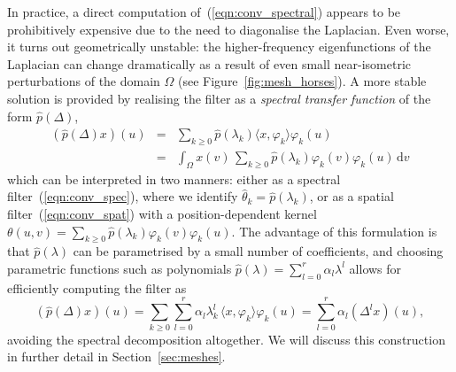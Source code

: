 %
In practice, a direct computation of~(\ref{eqn:conv_spectral}) appears to be prohibitively expensive due to the need to diagonalise the Laplacian. Even worse, 
it turns out geometrically unstable: the higher-frequency eigenfunctions of the Laplacian can change dramatically as a result of even small near-isometric perturbations of the domain $\Omega$ (see Figure~\ref{fig:mesh_horses}). 
%
%
A more stable solution is provided by realising the filter as a {\em spectral transfer function} of the form $\hat{p}(\Delta)$, 
\begin{eqnarray}
(\hat{p}(\Delta) x)(u) &=& \sum_{k\geq 0} \hat{p}(\lambda_k) \langle x, \varphi_k\rangle \varphi_k (u) \label{eqn:conv_spec} \\
%
&=& \int_\Omega x(v) \, \sum_{k\geq 0} \hat{p}(\lambda_k) \varphi_k(v) \varphi_k (u) \, \mathrm{d}v \label{eqn:conv_spat}
\end{eqnarray}
%
which can be interpreted in two manners: either as a spectral filter~(\ref{eqn:conv_spec}), where we identify $\hat{\theta}_k = \hat{p}(\lambda_k)$, or as a spatial filter~(\ref{eqn:conv_spat}) with a position-dependent kernel $\theta(u,v) = \sum_{k\geq 0} \hat{p}(\lambda_k) \varphi_k(v) \varphi_k (u)$.  
%
%
The advantage of this formulation is that $\hat{p}(\lambda)$ can be parametrised by a small number of coefficients, and choosing parametric functions such as polynomials $\hat{p}(\lambda) = \sum_{l=0}^r \alpha_l \lambda^l$ allows for efficiently computing the filter as 
$$
(\hat{p}(\Delta) x)(u) = \sum_{k\geq 0} \sum_{l= 0}^r \alpha_l \lambda_k^l \, \langle x, \varphi_k\rangle \varphi_k (u) = \sum_{l= 0}^r \alpha_l (\Delta^l x)(u),
$$
avoiding the spectral decomposition altogether. 
%
We will discuss this construction in further detail in Section~\ref{sec:meshes}. 

